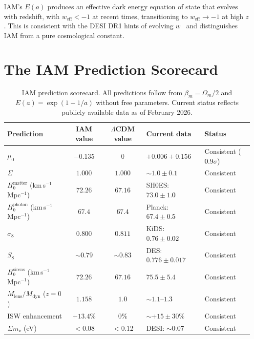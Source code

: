\documentclass[12pt,a4paper]{article}
\begin{document}
IAM's $E(a)$ produces an effective dark energy equation of state that evolves
with redshift, with $w_\mathrm{eff} < -1$ at recent times, transitioning to
$w_\mathrm{eff} \to -1$ at high $z$. This is consistent with the DESI
DR1 hints of evolving $w$~\citep{DESI2025} and distinguishes IAM from a pure
cosmological constant.

\section{The IAM Prediction Scorecard}

\begin{landscape}
\begin{table}[h]
\centering
\small
\caption{IAM prediction scorecard. All predictions follow from $\beta_m = \Omega_m/2$
and $E(a) = \exp(1-1/a)$ without free parameters. Current status reflects
publicly available data as of February 2026.}
\label{tab:scorecard}
\begin{tabular}{p{3.5cm}ccp{3.5cm}l}
\toprule
Prediction & IAM value & $\Lambda$CDM value & Current data & Status \\
\midrule
$\mu_0$ & $-0.135$ & $0$ & $+0.006 \pm 0.156$ & Consistent ($0.9\sigma$) \\
$\Sigma$ & $1.000$ & $1.000$ & $\sim 1.0 \pm 0.1$ & Consistent \\
$H_0^\mathrm{matter}$ (km\,s$^{-1}$\,Mpc$^{-1}$) & $72.26$ & $67.16$ & SH0ES: $73.0 \pm 1.0$ & Consistent \\
$H_0^\mathrm{photon}$ (km\,s$^{-1}$\,Mpc$^{-1}$) & $67.4$ & $67.4$ & Planck: $67.4 \pm 0.5$ & Consistent \\
$\sigma_8$ & $0.800$ & $0.811$ & KiDS: $0.76 \pm 0.02$ & Consistent \\
$S_8$ & $\sim 0.79$ & $\sim 0.83$ & DES: $0.776 \pm 0.017$ & Consistent \\
$H_0^\mathrm{sirens}$ (km\,s$^{-1}$\,Mpc$^{-1}$) & $72.26$ & $67.16$ & $75.5 \pm 5.4$ & Consistent \\
$M_\mathrm{lens}/M_\mathrm{dyn}$ ($z=0$) & $1.158$ & $1.0$ & $\sim 1.1$--$1.3$ & Consistent \\
ISW enhancement & $+13.4\%$ & $0\%$ & $\sim +15 \pm 30\%$ & Consistent \\
$\Sigma m_\nu$ (eV) & $< 0.08$ & $< 0.12$ & DESI: $\sim 0.07$ & Consistent \\
\bottomrule
\end{tabular}
\end{table}
\end{landscape}
\end{document}
